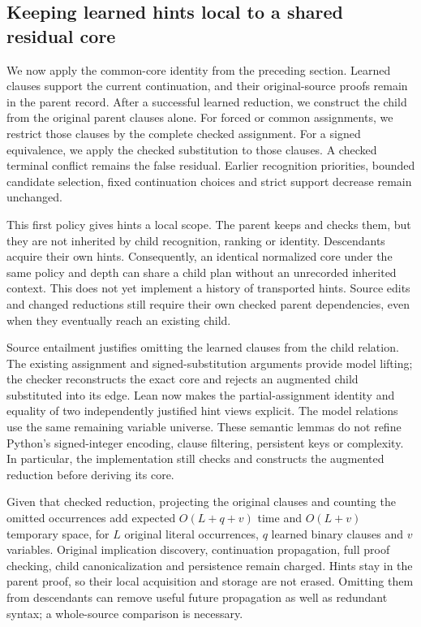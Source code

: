 \documentclass[11pt,a4paper]{article}
\numberwithin{equation}{section}
\theoremstyle{plain}
\theoremstyle{definition}
\theoremstyle{remark}
\begin{document}
\subsection{Keeping learned hints local to a shared residual core}
\label{sec:learning-core}

We now apply the common-core identity from the preceding section. Learned clauses support the current continuation, and their original-source proofs remain in the parent record. After a successful learned reduction, we construct the child from the original parent clauses alone. For forced or common assignments, we restrict those clauses by the complete checked assignment. For a signed equivalence, we apply the checked substitution to those clauses. A checked terminal conflict remains the false residual. Earlier recognition priorities, bounded candidate selection, fixed continuation choices and strict support decrease remain unchanged.

This first policy gives hints a local scope. The parent keeps and checks them, but they are not inherited by child recognition, ranking or identity. Descendants acquire their own hints. Consequently, an identical normalized core under the same policy and depth can share a child plan without an unrecorded inherited context. This does not yet implement a history of transported hints. Source edits and changed reductions still require their own checked parent dependencies, even when they eventually reach an existing child.

Source entailment justifies omitting the learned clauses from the child relation. The existing assignment and signed-substitution arguments provide model lifting; the checker reconstructs the exact core and rejects an augmented child substituted into its edge. Lean now makes the partial-assignment identity and equality of two independently justified hint views explicit. The model relations use the same remaining variable universe. These semantic lemmas do not refine Python's signed-integer encoding, clause filtering, persistent keys or complexity. In particular, the implementation still checks and constructs the augmented reduction before deriving its core.

Given that checked reduction, projecting the original clauses and counting the omitted occurrences add expected $O(L+q+v)$ time and $O(L+v)$ temporary space, for $L$ original literal occurrences, $q$ learned binary clauses and $v$ variables. Original implication discovery, continuation propagation, full proof checking, child canonicalization and persistence remain charged. Hints stay in the parent proof, so their local acquisition and storage are not erased. Omitting them from descendants can remove useful future propagation as well as redundant syntax; a whole-source comparison is necessary.
\end{document}
